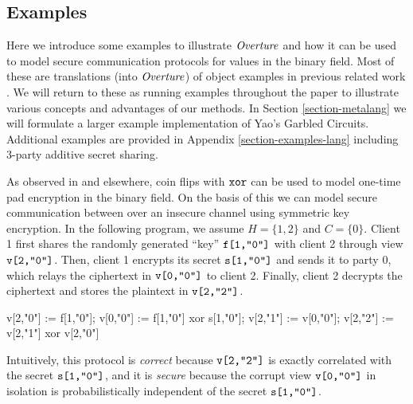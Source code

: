 \subsection{Examples}
\label{section-minicat-examples}

Here we introduce some examples to illustrate $\mathit{Overture}$ and how it
can be used to model secure communication protocols for values in the
binary field. Most of these are translations (into $\mathit{Overture}$) of
object examples in previous related work
\cite{barthe2019probabilistic,darais2019language}.  We will return to
these as running examples throughout the paper to illustrate various
concepts and advantages of our methods. In Section
\ref{section-metalang} we will formulate a larger example
implementation of Yao's Garbled Circuits. Additional examples
are provided in Appendix \ref{section-examples-lang} including 3-party
additive secret sharing.
\begin{example}
  \label{example-otp}
As observed in \cite{barthe2019probabilistic} and elsewhere, coin flips with $\texttt{xor}$ can
be used to model one-time pad encryption in the binary field. On the
basis of this we can model secure communication between over an
insecure channel using symmetric key encryption. In the following
program, we assume $H = \{ 1,2 \}$ and $C = \{ 0 \}$. Client 1 first
shares the randomly generated ``key'' $\texttt{f[1,"0"]}$ with client 2
through view $\texttt{v[2,"0"]}$. Then, client 1 encrypts its secret
$\texttt{s[1,"0"]}$ and sends it to party 0, which relays the ciphertext in
$\texttt{v[0,"0"]}$ to client 2. Finally, client 2 decrypts the ciphertext
and stores the plaintext in $\texttt{v[2,"2"]}$.
{\small
  \begin{verbatimtab}
    v[2,"0"] := f[1,"0"];
    v[0,"0"] := f[1,"0"] xor s[1,"0"];
    v[2,"1"] := v[0,"0"];
    v[2,"2"] := v[2,"1"] xor v[2,"0"]  \end{verbatimtab}
}
Intuitively, this protocol is \emph{correct} because $\texttt{v[2,"2"]}$ is
exactly correlated with the secret $\texttt{s[1,"0"]}$, and it is
\emph{secure} because the corrupt view $\texttt{v[0,"0"]}$ in isolation is
probabilistically independent of the secret $\texttt{s[1,"0"]}$.
\end{example}

